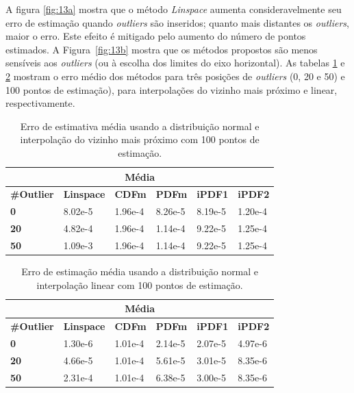 A figura \ref{fig:13a} mostra que o método \textit{Linspace} aumenta consideravelmente seu erro de estimação quando \textit{outliers} são inseridos; quanto mais distantes os \textit{outliers}, maior o erro. Este efeito é mitigado pelo aumento do número de pontos estimados.
A Figura~\ref{fig:13b} mostra que os métodos propostos são menos sensíveis aos \textit{outliers} (ou à escolha dos limites do eixo horizontal). As tabelas \ref{tab:near} e \ref{tab:lin} mostram o erro médio dos métodos para três posições de \textit{outliers} (0, 20 e 50) e 100 pontos de estimação), para interpolações do vizinho mais próximo e linear, respectivamente.

\begin{table}[H]
	\centering
	\caption{Erro de estimativa média usando a distribuição normal e interpolação do vizinho mais próximo com 100 pontos de estimação.}
	\label{tab:near}
	\begin{tabular}{llllll}
		\hline
		\multicolumn{6}{c}{\textbf{Média}}                                                                                             \\ \hline
		\multicolumn{1}{l|}{\textbf{\#Outlier}} & \textbf{Linspace} & \textbf{CDFm} & \textbf{PDFm} & \textbf{iPDF1} & \textbf{iPDF2} \\ \hline
		\multicolumn{1}{l|}{\textbf{0}}         & 8.02e-5           & 1.96e-4       & 8.26e-5       & 8.19e-5        & 1.20e-4        \\
		\multicolumn{1}{l|}{\textbf{20}}        & 4.82e-4           & 1.96e-4       & 1.14e-4       & 9.22e-5        & 1.25e-4        \\
		\multicolumn{1}{l|}{\textbf{50}}        & 1.09e-3           & 1.96e-4       & 1.14e-4       & 9.22e-5        & 1.25e-4        \\ \hline
	\end{tabular}
	
\end{table}

\begin{table}[H]
	\centering
	\caption{Erro de estimação média usando a distribuição normal e interpolação linear com 100 pontos de estimação.}
	\label{tab:lin}
	\begin{tabular}{llllll}
		\hline
		\multicolumn{6}{c}{\textbf{Média}}                                                                                             \\ \hline
		\multicolumn{1}{l|}{\textbf{\#Outlier}} & \textbf{Linspace} & \textbf{CDFm} & \textbf{PDFm} & \textbf{iPDF1} & \textbf{iPDF2} \\ \hline
		\multicolumn{1}{l|}{\textbf{0}}         & 1.30e-6           & 1.01e-4       & 2.14e-5       & 2.07e-5        & 4.97e-6        \\
		\multicolumn{1}{l|}{\textbf{20}}        & 4.66e-5           & 1.01e-4       & 5.61e-5       & 3.01e-5        & 8.35e-6        \\
		\multicolumn{1}{l|}{\textbf{50}}        & 2.31e-4           & 1.01e-4       & 6.38e-5       & 3.00e-5        & 8.35e-6      \\
		\hline
	\end{tabular}
	\
\end{table}


